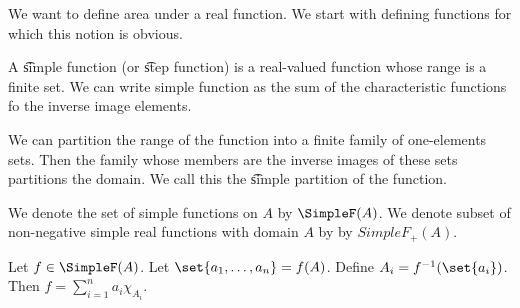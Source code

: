 

We want to define area under a real function.
We start with defining functions for which this notion is obvious.


A \t{simple function} (or \t{step function}) is a real-valued function whose range is a finite set.
We can write simple function as the sum of the characteristic functions fo the inverse image elements.

We can partition the range of the function into a finite family of one-elements sets.
Then the family whose members are the inverse images of these sets partitions the domain.
We call this the \t{simple partition} of the function.


We denote the set of simple functions on $A$ by $\SimpleF(A)$.
We denote subset of non-negative simple real functions with domain $A$ by by $SimpleF_+(A)$.

Let $f \in \SimpleF(A)$.
Let $\set{a_1, \dots, a_n} = f(A)$.
Define $A_i = f^{-1}(\set{a_i})$.
Then $f = \sum_{i = 1}^{n} a_i \chi_{A_i}$.

\blankpage
